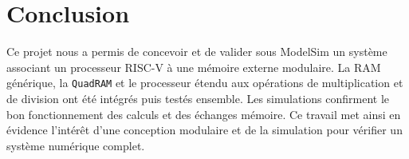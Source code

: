 \section{Conclusion}

Ce projet nous a permis de concevoir et de valider sous ModelSim un système associant un processeur RISC-V à une mémoire externe modulaire. La RAM générique, la \texttt{QuadRAM} et le processeur étendu aux opérations de multiplication et de division ont été intégrés puis testés ensemble. Les simulations confirment le bon fonctionnement des calculs et des échanges mémoire. Ce travail met ainsi en évidence l’intérêt d’une conception modulaire et de la simulation pour vérifier un système numérique complet.
